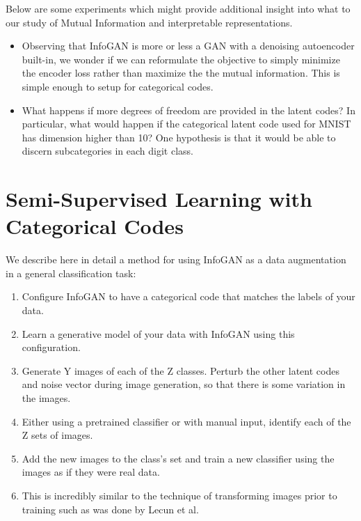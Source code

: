 \documentclass{article}
\begin{document}
Below are some experiments which might provide additional insight into what to our study of Mutual Information and interpretable representations. 

\begin{itemize}
    \item Observing that InfoGAN is more or less a GAN with a denoising autoencoder built-in, we wonder if we can reformulate the objective to simply minimize the encoder loss rather than maximize the the mutual information. This is simple enough to setup for categorical codes.
    \item  What happens if more degrees of freedom are provided in the latent codes? In particular, what would happen if the categorical latent code used for MNIST has dimension higher than 10? One hypothesis is that it would be able to discern subcategories in each digit class.
\end{itemize}

\section{Semi-Supervised Learning with Categorical Codes}

We describe here in detail a method for using InfoGAN as a data augmentation in a general classification task:

\begin{enumerate}
    \item Configure InfoGAN to have a categorical code that matches the labels of your data.
    \item Learn a generative model of your data with InfoGAN using this configuration.
    \item Generate Y images of each of the Z classes. Perturb the other latent codes and noise vector during image generation, so that there is some variation in the images.
    \item Either using a pretrained classifier or with manual input, identify each of the Z sets of images.
    \item Add the new images to the class's set and train a new classifier using the images as if they were real data.
    \item This is incredibly similar to the technique of transforming images prior to training such as was done by Lecun et al.
\end{enumerate}
\end{document}
